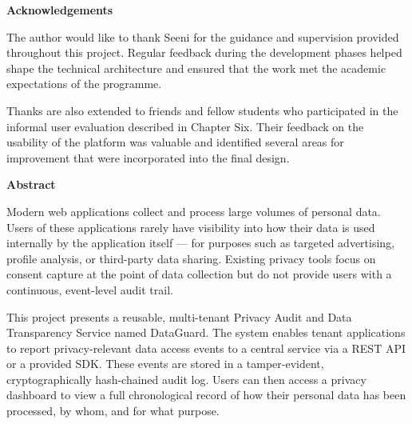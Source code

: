 \documentclass[a4paper,12pt,onecolumn]{report}
\begin{document}
\textbf{Acknowledgements}

\vspace{0.5cm}

The author would like to thank Seeni for the guidance and supervision provided throughout this project.
Regular feedback during the development phases helped shape the technical architecture and ensured that the work met the academic expectations of the programme.

Thanks are also extended to friends and fellow students who participated in the informal user evaluation described in Chapter Six.
Their feedback on the usability of the platform was valuable and identified several areas for improvement that were incorporated into the final design.

\newpage

\tableofcontents
\newpage

\listoftables
\newpage

\listoffigures
\newpage

\textbf{Abstract}

\vspace{0.5cm}

Modern web applications collect and process large volumes of personal data.
Users of these applications rarely have visibility into how their data is used internally by the application itself --- for purposes such as targeted advertising, profile analysis, or third-party data sharing.
Existing privacy tools focus on consent capture at the point of data collection but do not provide users with a continuous, event-level audit trail.

This project presents a reusable, multi-tenant Privacy Audit and Data Transparency Service named DataGuard.
The system enables tenant applications to report privacy-relevant data access events to a central service via a REST API or a provided SDK.
These events are stored in a tamper-evident, cryptographically hash-chained audit log.
Users can then access a privacy dashboard to view a full chronological record of how their personal data has been processed, by whom, and for what purpose.
\end{document}
